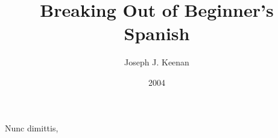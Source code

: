 \documentclass[14pt,a4paper,oneside]{memoir}
\begin{document}
\frontmatter

\begin{titlingpage}
\title{Breaking Out of Beginner's Spanish}
\posttitle{\par\vskip1em{\normalfont\normalsize\maltese\par}\end{center}}
\author{Joseph J. Keenan}
\date{2004}

\maketitle
\end{titlingpage}

\tableofcontents*



\mainmatter
















\backmatter



\begin{flushright}
    {\tiny{Nunc dimittis}, \DTMnow}
\end{flushright}
\end{document}
